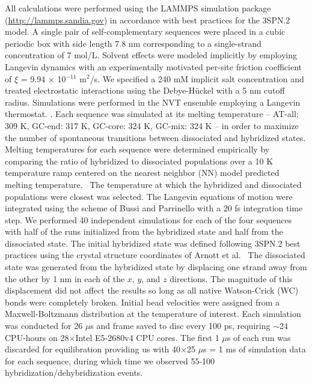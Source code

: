 \documentclass[journal=jpcbfk,manuscript=article]{achemso}
\begin{document}
All calculations were performed using the LAMMPS simulation package (\url{http://lammps.sandia.gov}) in accordance with best practices for the 3SPN.2 model. \citep{Plimpton1997FastDynamics} A single pair of self-complementary sequences were placed in a cubic periodic box with side length 7.8 nm corresponding to a single-strand concentration of 7 mol/L. Solvent effects were modeled implicitly by employing Langevin dynamics \citep{DunwegB.Paul1991BrownianNumbers., Bussi2007AccurateDynamics} with an experimentally motivated per-site friction coefficient of $\xi$ = 9.94 $\times$ 10$^{-11}$ m$^2$/s. \citep{Nkodo2001DiffusionElectrophoresis, Hinckley2013AnHybridization} We specified a 240 mM implicit salt concentration and treated electrostatic interactions using the Debye-H{\"u}ckel with a 5 nm cutoff radius. \citep{Debye1923ZurElektrolyte} Simulations were performed in the NVT ensemble employing a Langevin thermostat. \citep{Schneider1978Molecular-dynamicsTransitions}. Each sequence was simulated at its melting temperature -- AT-all: 309 K, GC-end: 317 K, GC-core: 324 K, GC-mix: 324 K -- in order to maximize the number of spontaneous transitions between dissociated and hybridized states. Melting temperatures for each sequence were determined empirically by comparing the ratio of hybridized to dissociated populations over a 10 K temperature ramp centered on the nearest neighbor (NN) model predicted melting temperature.~\citep{SantaLucia1998AThermodynamics, Santalucia2004TheMotifs} The temperature at which the hybridized and dissociated populations were closest was selected. The Langevin equations of motion were integrated using the scheme of Bussi and Parrinello \citep{Bussi2007AccurateDynamics} with a 20 fs integration time step. We performed 40 independent simulations for each of the four sequences with half of the runs initialized from the hybridized state and half from the dissociated state. The initial hybridized state was defined following 3SPN.2 best practices using the crystal structure coordinates of Arnott et al.~\citep{Arnott1976CRCBiology} The dissociated state was generated from the hybridized state by displacing one strand away from the other by 1 nm in each of the $x$, $y$, and $z$ directions. The magnitude of this displacement did not affect the results so long as all native Watson-Crick (WC) bonds were completely broken. Initial bead velocities were assigned from a Maxwell-Boltzmann distribution at the temperature of interest. Each simulation was conducted for 26 $\mu$s and frame saved to disc every 100 ps, requiring $\sim$24 CPU-hours on 28$\times$Intel E5-2680v4 CPU cores. The first 1 $\mu$s of each run was discarded for equilibration providing us with 40$\times$25 $\mu$s = 1 ms of simulation data for each sequence, during which time we observed 55-100 hybridization/dehybridization events.
\end{document}
